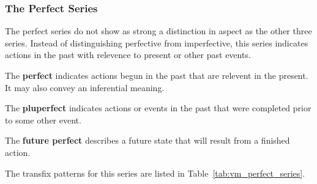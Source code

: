 \documentclass[grammar]{subfiles}
\begin{document}
  \subsubsection{The Perfect Series}
  \label{sssec:vm_perfect_series}

  The perfect series do not show as strong a distinction in aspect as the other three series. 
  Instead of distinguishing perfective from imperfective, this series indicates actions in the past with relevence to present or other past events.   
  
  \begin{itemize*}
    \item The \textbf{perfect} indicates actions begun in the past that are relevent in the present.  It may also convey an inferential meaning.
    \item The \textbf{pluperfect} indicates actions or events in the past that were completed prior to some other event. 
    \item The \textbf{future perfect} describes a future state that will result from a finished action.
  \end{itemize*}

  The transfix patterns for this series are listed in Table~\ref{tab:vm_perfect_series}. 
\end{document}
